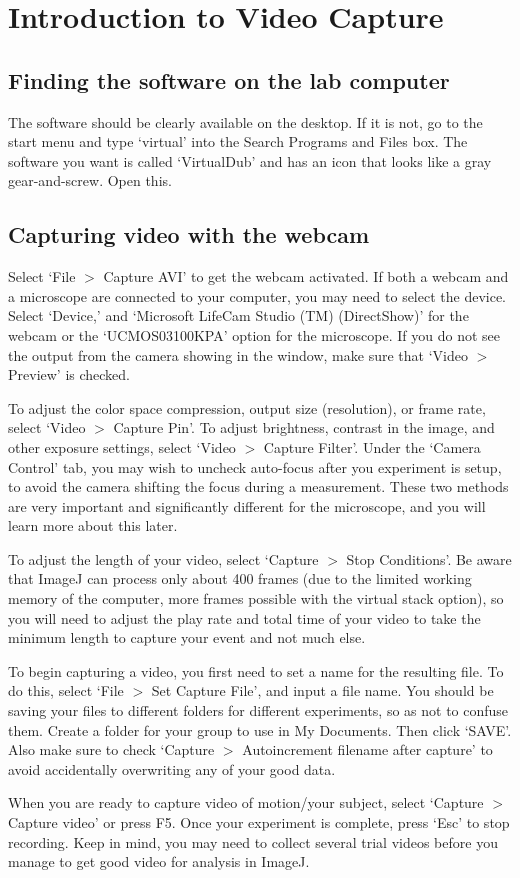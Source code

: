 \chapter{Introduction to Video Capture}
\thispagestyle{fancy}
\section*{Finding the software on the lab computer}
The software should be clearly available on the desktop. 
If it is not, go to the start menu and type `virtual' into the Search Programs and Files box. 
The software you want is called `VirtualDub' and has an icon that looks like a gray gear-and-screw. 
Open this.
\section*{Capturing video with the webcam}
Select `File $>$ Capture AVI' to get the webcam activated. 
If both a webcam and a microscope are connected to your computer, you may need to select the device. 
Select `Device,' and `Microsoft LifeCam Studio (TM) (DirectShow)' for the webcam or the `UCMOS03100KPA' option for the microscope.
If you do not see the output from the camera showing in the window, make sure that `Video $>$ Preview' is checked.
\par 
To adjust the color space compression, output size (resolution), or frame rate, select `Video $>$ Capture Pin'. 
To adjust brightness, contrast in the image, and other exposure settings, select `Video $>$ Capture Filter'. 
Under the `Camera Control' tab, you may wish to uncheck auto-focus after you experiment is setup, to avoid the camera shifting the focus during a measurement.
These two methods are very important and significantly different for the microscope, and you will learn more about this later. 
\par 
To adjust the length of your video, select ‘Capture $>$ Stop Conditions’. 
Be aware that ImageJ can process only about 400 frames (due to the limited working memory of the computer, more frames possible with the virtual stack option), so you will need to adjust the play rate and total time of your video to take the minimum length to capture your event and not much else. 
\par 
To begin capturing a video, you first need to set a name for the resulting file. 
To do this, select `File $>$ Set Capture File', and input a file name. 
You should be saving your files to different folders for different experiments, so as not to confuse them. 
Create a folder for your group to use in My Documents. 
Then click `SAVE'. 
Also make sure to check `Capture $>$ Autoincrement filename after capture' to avoid accidentally overwriting any of your good data.
\par 
When you are ready to capture video of motion/your subject, select `Capture $>$ Capture video' or press F5. Once your experiment is complete, press `Esc' to stop recording. 
Keep in mind, you may need to collect several trial videos before you manage to get good video for analysis in ImageJ.

